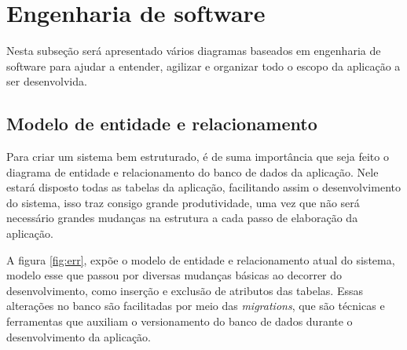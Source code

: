 
\section{Engenharia de software}
Nesta subseção será apresentado vários diagramas baseados em engenharia de software para ajudar a entender, agilizar e organizar todo o escopo da aplicação a ser desenvolvida.

\subsection{Modelo de entidade e relacionamento}
Para criar um sistema bem estruturado, é de suma importância que seja feito o diagrama de entidade e relacionamento do banco de dados da aplicação. Nele estará disposto todas as tabelas da aplicação, facilitando assim o desenvolvimento do sistema, isso traz consigo grande produtividade, uma vez que não será necessário grandes mudanças na estrutura a cada passo de elaboração da aplicação.

A figura \ref{fig:err}, expõe o modelo de entidade e relacionamento atual do sistema, modelo esse que passou por diversas mudanças básicas ao decorrer do desenvolvimento, como inserção e exclusão de atributos das tabelas. Essas alterações no banco são facilitadas por meio das \textit{migrations}, que são técnicas e ferramentas que auxiliam o versionamento do banco de dados durante o desenvolvimento da aplicação.

